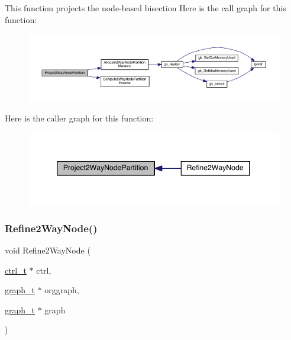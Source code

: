 This function projects the node-\/based bisection Here is the call graph for this function\+:\nopagebreak
\begin{figure}[H]
\begin{center}
\leavevmode
\includegraphics[width=350pt]{a00278_ab3d791e7adffa770602e257ecdaabd72_cgraph}
\end{center}
\end{figure}
Here is the caller graph for this function\+:\nopagebreak
\begin{figure}[H]
\begin{center}
\leavevmode
\includegraphics[width=346pt]{a00278_ab3d791e7adffa770602e257ecdaabd72_icgraph}
\end{center}
\end{figure}
\mbox{\label{a00278_a2fd4bd5f789c1c1248aa326d0cac9023}} 
\subsubsection{\texorpdfstring{Refine2\+Way\+Node()}{Refine2WayNode()}}
{\footnotesize\ttfamily void Refine2\+Way\+Node (\begin{DoxyParamCaption}\item[{\hyperlink{a00742}{ctrl\+\_\+t} $\ast$}]{ctrl,  }\item[{\hyperlink{a00734}{graph\+\_\+t} $\ast$}]{orggraph,  }\item[{\hyperlink{a00734}{graph\+\_\+t} $\ast$}]{graph }\end{DoxyParamCaption})}

